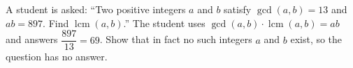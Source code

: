 A student is asked: ``Two positive integers $a$ and $b$ satisfy $\gcd(a,b)=13$ and $ab=897$. Find $\operatorname{lcm}(a,b)$.'' The student uses $\gcd(a,b)\cdot\operatorname{lcm}(a,b)=ab$ and answers $\dfrac{897}{13}=69$.
Show that in fact no such integers $a$ and $b$ exist, so the question has no answer.
